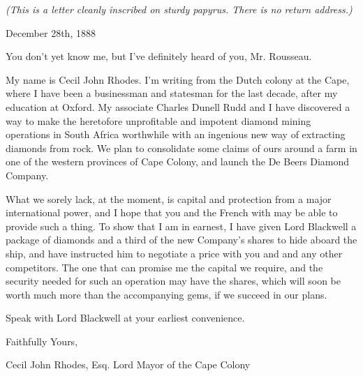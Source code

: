 \documentclass[white]{airship}
\begin{document}
\name{\wDeBeersFrance{}} %
{\em (This is a letter cleanly inscribed on sturdy papyrus. There is no return address.)}

December 28th, 1888

You don't yet know me, but I've definitely heard of you, Mr. Rousseau.

My name is Cecil John Rhodes. I'm writing from the Dutch colony at the Cape, where I have been a businessman and statesman for the last decade, after my education at Oxford. My associate Charles Dunell Rudd and I have discovered a way to make the heretofore unprofitable and impotent diamond mining operations in South Africa worthwhile with an ingenious new way of extracting diamonds from rock. We plan to consolidate some claims of ours around a farm in one of the western provinces of Cape Colony, and launch the De Beers Diamond Company.

What we sorely lack, at the moment, is capital and protection from a major international power, and I hope that you and the French with may be able to provide such a thing. To show that I am in earnest, I have given Lord Blackwell a package of diamonds and a third of the new Company's shares to hide aboard the ship, and have instructed him to negotiate a price with you and and any other competitors. The one that can promise me the capital we require, and the security needed for such an operation may have the shares, which will soon be worth much more than the accompanying gems, if we succeed in our plans.

Speak with Lord Blackwell at your earliest convenience.

Faithfully Yours, 

Cecil John Rhodes, Esq.
Lord Mayor of the Cape Colony
\end{document}
